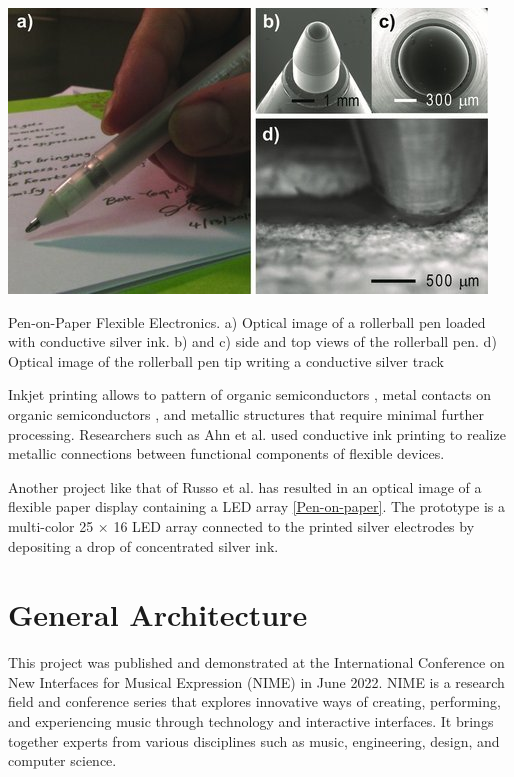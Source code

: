 \begin{marginfigure}
   \centering
   \includegraphics{images/IS_pen-on-paper.jpg}
   \caption{Pen-on-Paper Flexible Electronics. a) Optical image of a rollerball pen loaded with conductive silver ink. b) and c) side and top views of the rollerball pen. d) Optical image of the rollerball pen tip writing a conductive silver track}
   \label{fig:IS_pen-on-paper}
\end{marginfigure}

Inkjet printing allows to pattern of organic semiconductors \cite{kim2008heterogeneous}, metal contacts on organic semiconductors \cite{khan2019soft} \cite{wessely2020sprayable}, and metallic structures that require minimal further processing. Researchers such as Ahn et al. used conductive ink printing to realize metallic connections between functional components of flexible devices.

Another project like that of Russo et al. \cite{russo2011pen} has resulted in an optical image of a flexible paper display containing a LED array \ref{Pen-on-paper}. The prototype is a multi-color 25 × 16 LED array connected to the printed silver electrodes by depositing a drop of concentrated silver ink.

\section{General Architecture}

This project was published and demonstrated at the International Conference on New Interfaces for Musical Expression (NIME) in June 2022. NIME is a research field and conference series that explores innovative ways of creating, performing, and experiencing music through technology and interactive interfaces. It brings together experts from various disciplines such as music, engineering, design, and computer science. 

